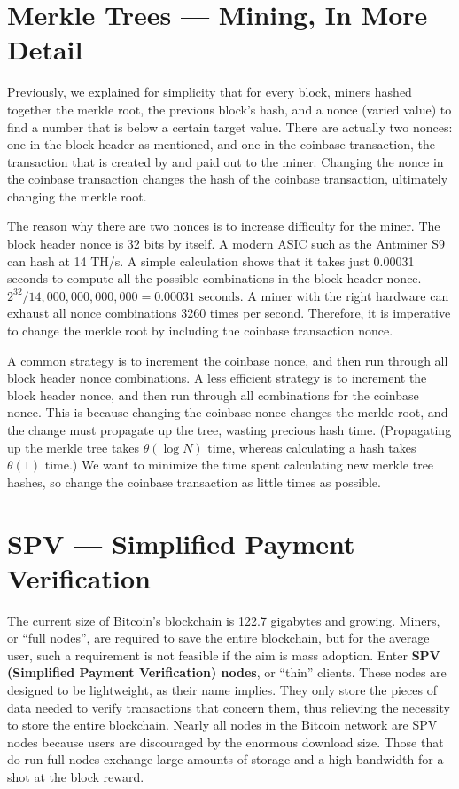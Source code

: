 \documentclass[11pt]{article}
\begin{document}
 \section*{Merkle Trees --- Mining, In More Detail}
 
 Previously, we explained for simplicity that for every block, miners hashed together the merkle root, the previous block's hash, and a nonce (varied value) to find a number that is below a certain target value. There are actually two nonces: one in the block header as mentioned, and one in the coinbase transaction, the transaction that is created by and paid out to the miner. Changing the nonce in the coinbase transaction changes the hash of the coinbase transaction, ultimately changing the merkle root.
 
 The reason why there are two nonces is to increase difficulty for the miner. The block header nonce is 32 bits by itself. A modern ASIC such as the Antminer S9 can hash at 14 TH/s. A simple calculation shows that it takes just 0.00031 seconds to compute all the possible combinations in the block header nonce. $2^{32} / 14,000,000,000,000 = 0.00031 \text{~seconds}$. A miner with the right hardware can exhaust all nonce combinations 3260 times per second. Therefore, it is imperative to change the merkle root by including the coinbase transaction nonce.
 
 A common strategy is to increment the coinbase nonce, and then run through all block header nonce combinations. A less efficient strategy is to increment the block header nonce, and then run through all combinations for the coinbase nonce. This is because changing the coinbase nonce changes the merkle root, and the change must propagate up the tree, wasting precious hash time. (Propagating up the merkle tree takes $\theta(\log N)$ time, whereas calculating a hash takes $\theta(1)$ time.) We want to minimize the time spent calculating new merkle tree hashes, so change the coinbase transaction as little times as possible.
 
 \section*{SPV --- Simplified Payment Verification}
 
 The current size of Bitcoin's blockchain is 122.7 gigabytes and growing. Miners, or ``full nodes'', are required to save the entire blockchain, but for the average user, such a requirement is not feasible if the aim is mass adoption. Enter \textbf{SPV (Simplified Payment Verification) nodes}, or ``thin'' clients. These nodes are designed to be lightweight, as their name implies. They only store the pieces of data needed to verify transactions that concern them, thus relieving the necessity to store the entire blockchain. Nearly all nodes in the Bitcoin network are SPV nodes because users are discouraged by the enormous download size. Those that do run full nodes exchange large amounts of storage and a high bandwidth for a shot at the block reward.
 
\end{document}
